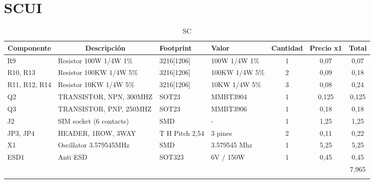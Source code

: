 \section{SCUI}
\begin{longtable}{|l|p{2.5cm}|p{2cm}|p{2cm}|c|c|c|}
\hline
\multicolumn{1}{|c|}{\textbf{Componente}} & \multicolumn{1}{c|}{\textbf{Descripción}} & \textbf{ Footprint} & \textbf{Valor} & \textbf{Cantidad} & \textbf{Precio x1} & \textbf{Total} \\ \hline
R9 & Resistor 100W 1/4W 1\%  & 3216[1206] & 100W 1/4W  1\% & 1 & 0,07 & 0,07 \\ \hline
R10, R13 & Resistor 100KW 1/4W 5\%  & 3216[1206] & 100KW 1/4W   5\% & 2 & 0,09 & 0,18 \\ \hline
R11, R12, R14 & Resistor 10KW 1/4W 5\%  & 3216[1206] & 10KW 1/4W   5\% & 3 & 0,08 & 0,24 \\ \hline
Q2 & TRANSISTOR, NPN, 300MHZ & SOT23 & MMBT3904 & 1 & 0,125 & 0,125 \\ \hline
Q3 & TRANSISTOR, PNP, 250MHZ & SOT23 & MMBT3906 & 1 & 0,18 & 0,18 \\ \hline
J2 & SIM socket (6 contacts) & SMD & - & 1 & 1,25 & 1,25 \\ \hline
JP3, JP4 & HEADER, 1ROW, 3WAY & T H Pitch 2,54 & 3 pines & 2 & 0,11 & 0,22 \\ \hline
X1 & Oscillator 3.579545MHz & SMD & 3.579545 Mhz & 1 & 5,25 & 5,25 \\ \hline
ESD1 & Anti ESD & SOT323 & 6V / 150W & 1 & 0,45 & 0,45 \\ \hline
 &  & \multicolumn{1}{l|}{} & \multicolumn{1}{l|}{} & \multicolumn{1}{l|}{} & \multicolumn{1}{l|}{} & 7,965 \\ \hline
\caption{SC}
\label{}
\end{longtable}

